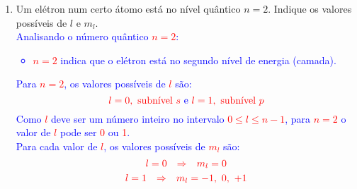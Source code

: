 \documentclass[a4paper, 12pt]{article}
\begin{document}
\begin{enumerate}
	\item Um elétron num certo átomo está no nível quântico \(n = 2\). Indique os valores possíveis de \(l\) e \(m_l\).
	      \\[10pt]
	      \textcolor{blue}{Analisando o número quântico \textcolor{red}{\(n = 2\)}:}
	      \textcolor{blue}{
		      \begin{itemize}
			      \item[] \textcolor{red}{\(n = 2\)} indica que o elétron está no segundo nível de energia (camada).
		      \end{itemize}
	      }
	      \textcolor{blue}{Para \textcolor{red}{\(n = 2\)}, os valores possíveis de \textcolor{red}{\(l\)} são:}
	      \[
		      \textcolor{blue}{\textcolor{red}{l = 0, \ \text{subnível \(s\)}} \text{ e } \textcolor{red}{l = 1, \text{ subnível \(p\)}}}
	      \]
	      \textcolor{blue}{Como \textcolor{red}{\(l\)} deve ser um número inteiro no intervalo \textcolor{red}{\(0 \leq l \leq n-1\)}, para \textcolor{red}{\(n = 2\)} o valor de \textcolor{red}{\(l\)} pode ser \textcolor{red}{0} ou \textcolor{red}{1}.}
	      \\[10pt]
	      \textcolor{blue}{Para cada valor de \textcolor{red}{\(l\)}, os valores possíveis de \textcolor{red}{\(m_l\)} são:}
	      \[
		      \textcolor{red}{l = 0} \quad \textcolor{red}{\Rightarrow} \quad \textcolor{red}{m_l = 0}
	      \]
	      \[
		      \textcolor{red}{l = 1} \quad \textcolor{red}{\Rightarrow} \quad \textcolor{red}{m_l = -1, \ 0,\ +1}
	      \]
	      

\end{enumerate}
\end{document}
